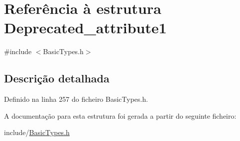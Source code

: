 \hypertarget{structDeprecated__attribute1}{}\section{Referência à estrutura Deprecated\+\_\+attribute1}
\label{structDeprecated__attribute1}


{\ttfamily \#include $<$Basic\+Types.\+h$>$}



\subsection{Descrição detalhada}


Definido na linha 257 do ficheiro Basic\+Types.\+h.



A documentação para esta estrutura foi gerada a partir do seguinte ficheiro\+:\begin{DoxyCompactItemize}
\item 
include/\hyperlink{BasicTypes_8h}{Basic\+Types.\+h}\end{DoxyCompactItemize}
